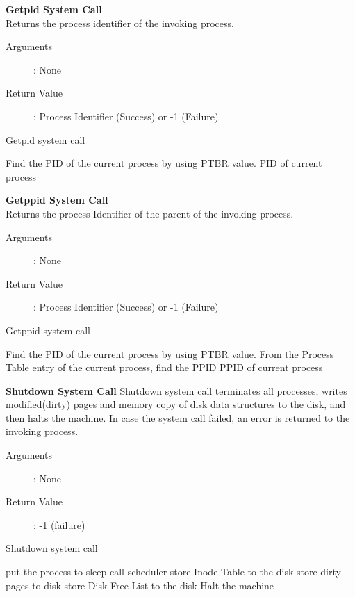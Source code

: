 \documentclass[10pt]{article}
\begin{document}
\textbf{Getpid System Call}\\
 Returns the process identifier of the invoking process.
\begin{description}
\item[Arguments]: None
\item[Return Value]: Process Identifier (Success) or -1 (Failure)
\end{description} 
\begin{algorithm}
\caption{Getpid system call}
\begin{algorithmic}
\STATE Find the PID of the current process by using PTBR value.
\RETURN PID of current process
\end{algorithmic}
\end{algorithm}
\textbf{Getppid System Call}\\
Returns the process Identifier of the parent of the invoking process.
\begin{description}
\item[Arguments]: None
\item[Return Value]: Process Identifier (Success) or -1 (Failure)
\end{description} 
\begin{algorithm}
\caption{Getppid system call}
\begin{algorithmic}
\STATE Find the PID of the current process by using PTBR value.
\STATE From the Process Table entry of the current process, find the PPID
\RETURN PPID of current process
\end{algorithmic}
\end{algorithm}
\textbf{Shutdown System Call}
Shutdown system call terminates all processes, writes modified(dirty) pages and memory copy of disk data structures to the disk, and then halts the machine. In case the system call failed, an error is returned to the invoking process. 
\begin{description}
\item[Arguments]: None
\item[Return Value]: -1 (failure)
\end{description} 
\begin{algorithm}
\caption{Shutdown system call}
\begin{algorithmic}
    \STATE put the process to sleep
    \STATE call scheduler
\ENDWHILE
\STATE store Inode Table to the disk
\STATE store dirty pages to disk
\STATE store Disk Free List to the disk
\STATE Halt the machine
\RETURN 
\end{algorithmic}
\end{algorithm}
\end{document}
